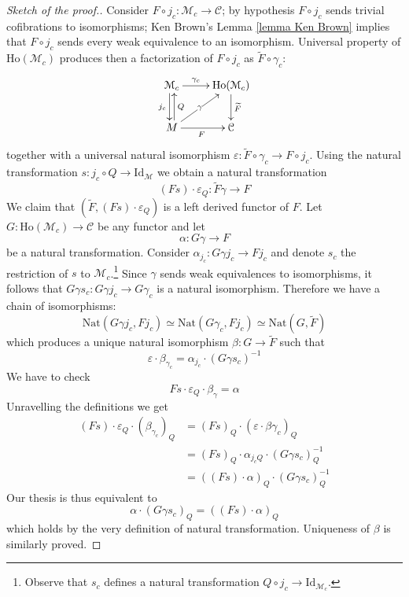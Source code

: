 \begin{refsection}
\begin{proof}[Sketch of the proof.]
Consider $F \circ j_c \colon \mathcal M_c \to \mathcal C$; by hypothesis $F \circ j_c$ sends trivial cofibrations to isomorphisms; Ken Brown's Lemma \ref{lemma Ken Brown} implies that $F \circ j_c$ sends every weak equivalence to an isomorphism. Universal property of $\mathrm{Ho}(\mathcal M_c)$ produces then a factorization of $F \circ j_c$ as $\widetilde{F} \circ \gamma_c$:
\[
\xymatrix{
\mathcal M_c \ar@<-.5ex>[d]_{j_c} \ar[r]^-{\gamma_c} & \mathrm{Ho}(\mathcal M_c) \ar[d]^{\widetilde{F}} \\ M \ar@<-.5ex>[u]_Q \ar[ur]|-\gamma \ar[r]_F & \mathcal C
}
\]
together with a universal natural isomorphism $\varepsilon \colon \widetilde{F} \circ \gamma_c \to F \circ j_c$. Using the natural transformation $s \colon j_c \circ Q \to \mathrm{Id}_{\mathcal M}$ we obtain a natural transformation
\[
(Fs) \cdot \varepsilon_Q \colon \widetilde{F} \gamma \to F
\]
We claim that $(\widetilde{F}, (Fs) \cdot \varepsilon_Q)$ is a left derived functor of $F$. Let $G \colon \mathrm{Ho}(\mathcal M_c) \to \mathcal C$ be any functor and let
\[
\alpha \colon G \gamma \to F
\]
be a natural transformation. Consider $\alpha_{j_c} \colon G \gamma j_c \to F j_c$ and denote $s_c$ the restriction of $s$ to $\mathcal M_c$.\footnote{Observe that $s_c$ defines a natural transformation $Q \circ j_c \to \mathrm{Id}_{\mathcal M_c}$.} Since $\gamma$ sends weak equivalences to isomorphisms, it follows that $G \gamma s_c \colon G \gamma j_c \to G \gamma_c$ is a natural isomorphism. Therefore we have a chain of isomorphisms:
\[
\mathrm{Nat}(G \gamma j_c, F j_c) \simeq \mathrm{Nat}(G\gamma_c, F j_c) \simeq \mathrm{Nat}(G, \widetilde{F})
\]
which produces a unique natural isomorphism $\beta \colon G \to \widetilde{F}$ such that
\[
\varepsilon \cdot \beta_{\gamma_c} = \alpha_{j_c} \cdot (G \gamma s_c)^{-1}
\]
We have to check
\[
Fs \cdot \varepsilon_Q \cdot \beta_\gamma = \alpha
\]
Unravelling the definitions we get
\begin{align*}
(Fs) \cdot \varepsilon_Q \cdot (\beta_{\gamma_c})_Q & = (Fs)_Q \cdot (\varepsilon \cdot \beta \gamma_c)_Q \\
& = (Fs)_Q \cdot \alpha_{j_c Q} \cdot (G \gamma s_c)^{-1}_Q \\
& = ((Fs) \cdot \alpha)_Q \cdot (G \gamma s_c)^{-1}_Q
\end{align*}
Our thesis is thus equivalent to
\[
\alpha \cdot (G \gamma s_c)_Q = ((Fs) \cdot \alpha)_Q
\]
which holds by the very definition of natural transformation. Uniqueness of $\beta$ is similarly proved.
\end{proof}


\end{refsection}

